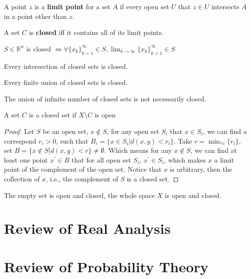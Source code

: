 			\begin{definition}
				A point $z$ is a \textbf{limit point} for a set $A$ if every open set $U$ that $z\in U$ intersects $A$ in a point other than $z$.
			\end{definition}


			\begin{definition}
				A set $C$ is \textbf{closed} iff it contains all of its limit points.
			\end{definition}

			\begin{theorem}
				$S\in \mathbb{R}^n$ is closed $\iff \forall \{x_k\}_{k=1}^\infty \in S, \lim_{k \rightarrow \infty} \{x_k\}_{k=1}^\infty \in S$
			\end{theorem}

			\begin{theorem}
				Every intersection of closed sets is closed.
			\end{theorem}

			\begin{theorem}
				Every finite union of closed sets is closed.
			\end{theorem}

			\begin{remark}
				The union of infinite number of closed sets is not necessarily closed.
			\end{remark}

			\begin{theorem}
				A set $C$ is a closed set if $X \setminus C$ is open
			\end{theorem}

			\begin{proof}
				Let $S$ be an open set, $x \notin S$, for any open set $S_i$ that $x\in S_i$, we can find a correspond $r_i > 0$, such that $B_i = \{x \in S_i | d(x, y) < r_i\}$. Take $r = \min_{\forall i}\{r_i\}$, set $B = \{x \notin S|d(x, y) < r\} \neq \emptyset$. Which means for any $x\notin S$, we can find at least one point $x^\prime \in B$ that for all open set $S_i$, $x^\prime \in S_i$, which makes $x$ a limit point of the complement of the open set. Notice that $x$ is arbitrary, then the collection of $x$, i.e., the complement of $S$ is a closed set.
			\end{proof}

			\begin{remark}
				The empty set is open and closed, the whole space $X$ is open and closed.
			\end{remark}

	\chapter{Review of Real Analysis}

	\chapter{Review of Probability Theory}


